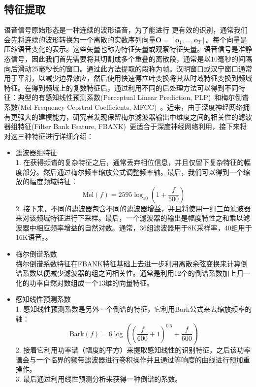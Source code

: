 \subsection{特征提取}
\label{sec:feat_extra}
语音信号原始形态是一种连续的波形语音，为了能进行 更有效的识别，通常我们会先将连续的波形转换为一个离散的实数序列向量$\mathbf{O}=\left[ \mathbf{o}_1, ..., \mathbf{o}_T \right]$。每个向量是压缩语音变化的表示。这些矢量也称为特征矢量或观察特征矢量。语音信号是准静态信号，因此我们首先需要将其切割成多个重叠的离散段，通常是以10毫秒的间隔向后滑动25毫秒长的窗口。通过此方法提取的段称为帧。汉明窗口或汉宁窗口通常用于平滑，以减少边界效应，然后使用快速傅立叶变换将其从时域特征变换到频域特征。在得到频域上的复数特征后，通过利用不同的后处理方法可以得到不同特征：典型的有感知线性预测系数(Perceptual Linear Prediction, PLP)~\cite{hermansky1990perceptual}和梅尔倒谱系数(Mel-Frequency Cepstral Coefficients, MFCC)~\cite{davis1980comparison}。近来，由于深度神经网络拥有更强大的建模能力，研究者发现保留梅尔滤波器输出中维度之间的相关性的滤波器组特征(Filter Bank Feature, FBANK)~\cite{seide2011feature}更适合于深度神经网络利用，接下来将对这三种特征进行详细介绍：
\begin{itemize}
    \item 滤波器组特征 \\
    1. 在获得频谱的复杂特征之后，通常丢弃相位信息，并且仅留下复杂特征的幅度部分。然后通过梅尔频率缩放公式调整频率轴。最后，我们可以得到一个缩放的幅度频域特征：
    \begin{equation}
        \text{Mel}(f)=2595 \log_{10}(1+\frac{f}{500}) 
    \end{equation}
    2. 接下来，不同的滤波器包含不同的滤波器增益，并且将使用一组三角滤波器来对该频域特征进行下采样。最后，一个滤波器的输出是幅度特性之和乘以滤波器中相应频率增益的自然对数。通常，36组滤波器用于8K采样率，40组用于16K语音。。
    \item 梅尔倒谱系数 \\
    梅尔倒谱系数特征在FBANK特征基础上去进一步利用离散余弦变换来计算倒谱系数以便减少滤波器的组之间相关性。通常是利用12个的倒谱系数加上归一化的功率自然对数组成一个13维的向量特征。
    \item 感知线性预测系数 \\
    1. 感知线性预测系数是另外一个倒谱的特征，它利用Bark公式来去缩放频率的轴：
    \begin{equation}
        \text{Bark}(f)=6\log \left( \left( \frac{f}{600}+1 \right)^{0.5}+\frac{f}{600} \right)
    \end{equation}
    2. 接着它利用功率谱（幅度的平方）来提取感知线性的识别特征，之后该功率谱会与一个临界的频带滤波器进行卷积操作并且通过等响度的曲线进行预加重操作。\\
    3. 最后通过利用线性预测分析来获得一种倒谱的系数。
\end{itemize}
